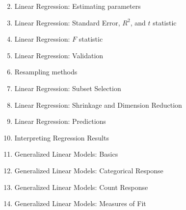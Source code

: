 \documentclass[12pt, titlepage, french]{report}
\begin{document}
\begin{ASM_chapter}
\begin{enumerate}
  \setcounter{enumi}{1}
	\item	Linear Regression:  Estimating parameters
	\item	Linear Regression:  Standard Error, $R^{2}$, and $t$ statistic
	\item	Linear Regression:  $F$ statistic
	\tcbline
	\item	Linear Regression:  Validation
	\item	Resampling methods
	\item	Linear Regression:  Subset Selection
	\item	Linear Regression:  Shrinkage and Dimension Reduction
	\tcbline
	\item	Linear Regression:  Predictions
	\item	Interpreting Regression Results
	\tcbline
	\item	Generalized Linear Models:  Basics
	\item	Generalized Linear Models:  Categorical Response
	\item	Generalized Linear Models:  Count Response
	\item	Generalized Linear Models:  Measures of Fit
\end{enumerate}
\end{ASM_chapter}
\end{document}
